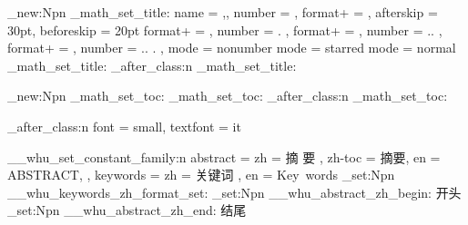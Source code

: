 \cs_new:Npn \whu_math_set_title:
  {
      {
        name       = {,},
        number     = {  },
        format+    = {  },
        afterskip  = 30pt,
        beforeskip = 20pt
      }
      {
        format+  = {  },
        number = { . },
      }
      {
        format+  = {  },
        number = { ..  },
      }
      {
        format+ = { \kaishu },
        number  = { .. .  },
      }
      {
         { mode = nonumber }
      }
      {
          { mode = starred }
      }
      {
          { mode = normal }
      }
  }
  { \whu_math_set_title: }
  { \whu_after_class:n { \whu_math_set_title: } }




\cs_new:Npn \whu_math_set_toc:
  {
      { \renewcommand { \contentsname } { 目\qquad 录 } }
      {  }
      {  }
  }
  { \whu_math_set_toc: }
  { \whu_after_class:n { \whu_math_set_toc: } }



\whu_after_class:n
  {
    \RequirePackage { caption }
    \captionsetup
      {
        font     = small,
        textfont = it
      }
  }



\allowdisplaybreaks



\__whu_set_constant_family:n
  {
    abstract =
      {
        zh     = 摘 \qquad 要 ,
        zh-toc = 摘要,
        en     = ABSTRACT,
      },
    keywords =
      {
        zh = 关键词 ,
        en = Key~words
      }
  }
\cs_set:Npn \__whu_keywords_zh_format_set:
  { \heiti{} }
\cs_set:Npn \__whu_abstract_zh_begin: 
  {
    开头
  }
\cs_set:Npn \__whu_abstract_zh_end: 
  {
    结尾
  }



